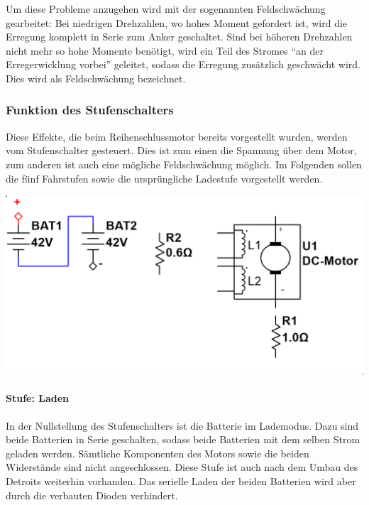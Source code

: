 Um diese Probleme anzugehen wird mit der sogenannten Feldschwächung gearbeitet: Bei niedrigen Drehzahlen, wo hohes Moment gefordert ist, wird die Erregung komplett in Serie zum Anker geschaltet. Sind bei höheren Drehzahlen nicht mehr so hohe Momente benötigt, wird ein Teil des Stromes "`an der Erregerwicklung vorbei"' geleitet, sodass die Erregung zusätzlich geschwächt wird. Dies wird als Feldschwächung bezeichnet.

\subsubsection{Funktion des Stufenschalters}

Diese Effekte, die beim Reihenschlussmotor bereits vorgestellt wurden, werden vom Stufenschalter gesteuert. Dies ist zum einen die Spannung über dem Motor, zum anderen ist auch eine mögliche Feldschwächung möglich. Im Folgenden sollen die fünf Fahrstufen sowie die ursprüngliche Ladestufe vorgestellt werden.

\begin{minipage}{0.49\textwidth}
	\includegraphics[width=\columnwidth]{images/Stufenschalter/Laden.png}%
\end{minipage}
\begin{minipage}{0.5\textwidth}
	\paragraph{Stufe: Laden}
	In der Nullstellung des Stufenschalters ist die Batterie im Lademodus. Dazu sind beide Batterien in Serie geschalten, sodass beide Batterien mit dem selben Strom geladen werden. Sämtliche Komponenten des Motors sowie die beiden Widerstände sind nicht angeschlossen. Diese Stufe ist auch nach dem Umbau des Detroits weiterhin vorhanden. Das serielle Laden der beiden Batterien wird aber durch die verbauten Dioden verhindert.
\end{minipage}

